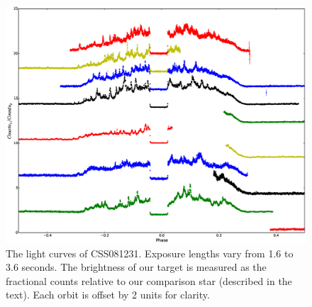 \documentclass[a4paper,fleqn,usenatbib]{mnras}
\begin{document}
\begin{figure}
\centering
\includegraphics[width=\textwidth]{images/CSS081231_TNT_photometry.eps}
\caption[Caption for photometry]{The light curves of CSS081231. Exposure lengths vary from 1.6 to 3.6 seconds. The brightness of our target is measured as the fractional counts relative to our comparison star (described in the text). Each orbit is offset by 2 units for clarity.}
\label{fig:lightcurves}
\end{figure}
\end{document}
